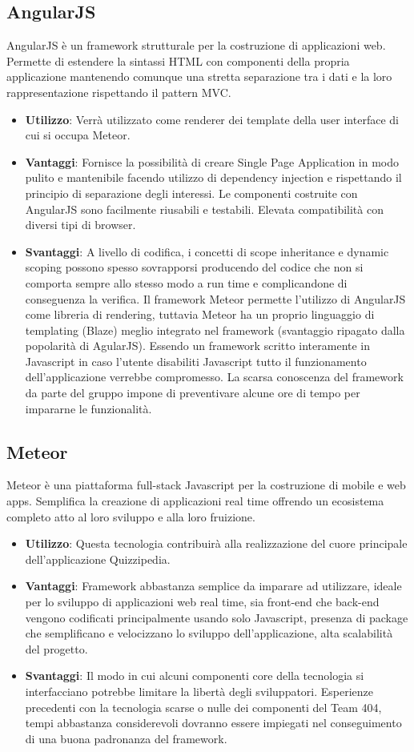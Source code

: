 	\subsection{AngularJS}
	AngularJS è un framework strutturale per la costruzione di applicazioni web. Permette di estendere la sintassi HTML con componenti della propria applicazione mantenendo comunque una stretta separazione tra i dati e la loro rappresentazione rispettando il pattern MVC.
	\begin{itemize}
		\item\textbf{Utilizzo}: Verrà utilizzato come renderer dei template della user interface di cui si occupa Meteor.
		\item\textbf{Vantaggi}: Fornisce la possibilità di creare Single Page Application in modo pulito e mantenibile facendo utilizzo di dependency injection e rispettando il principio di separazione degli interessi. Le componenti costruite con AngularJS sono facilmente riusabili e testabili. Elevata compatibilità con diversi tipi di browser.
		\item\textbf{Svantaggi}: A livello di codifica, i concetti di scope inheritance e dynamic scoping possono spesso sovrapporsi producendo del codice che non si comporta sempre allo stesso modo a run time e complicandone di conseguenza la verifica. 
		Il framework Meteor permette l'utilizzo di AngularJS come libreria di rendering, tuttavia Meteor ha un proprio linguaggio di templating (Blaze) meglio integrato nel framework (svantaggio ripagato dalla popolarità di AgularJS). 
		Essendo un framework scritto interamente in Javascript in caso l'utente disabiliti Javascript tutto il funzionamento dell'applicazione verrebbe compromesso.
		La scarsa conoscenza del framework da parte del gruppo impone di preventivare alcune ore di tempo per impararne le funzionalità.
	\end{itemize}
	\subsection{Meteor}
	Meteor è una piattaforma full-stack Javascript per la costruzione di mobile e web apps. Semplifica la creazione di applicazioni real time offrendo un ecosistema completo atto al loro sviluppo e alla loro fruizione.
	\begin{itemize}
		\item\textbf{Utilizzo}: Questa tecnologia contribuirà alla realizzazione del cuore principale dell'applicazione Quizzipedia.
		\item\textbf{Vantaggi}: Framework abbastanza semplice da imparare ad utilizzare, ideale per lo sviluppo di applicazioni web real time, sia front-end che back-end vengono codificati principalmente usando solo Javascript, presenza di package che semplificano e velocizzano lo sviluppo dell'applicazione, alta scalabilità del progetto.
		\item\textbf{Svantaggi}: Il modo in cui alcuni componenti core della tecnologia si interfacciano potrebbe limitare la libertà degli sviluppatori. Esperienze precedenti con la tecnologia scarse o nulle dei componenti del Team 404, tempi abbastanza considerevoli dovranno essere impiegati nel conseguimento di una buona padronanza del framework.
	\end{itemize}
	\newpage